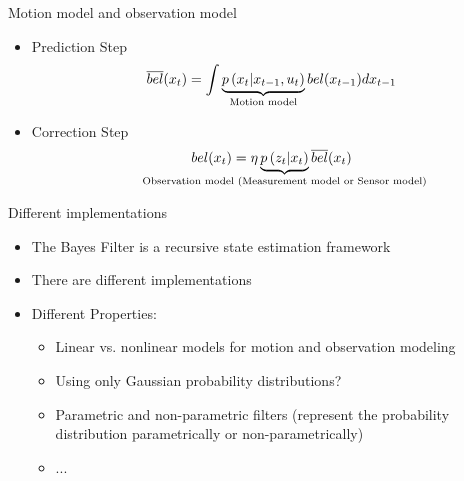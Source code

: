 \begin{frame}{Motion model and observation model}
    \begin{itemize}
     \item Prediction Step
     \begin{equation*}
     \overline{bel}(x_{t}) = \int \underbrace{p\left(x_{t} | x_{t-1}, u_{t} \right)}_{\text{Motion model}} bel(x_{t-1}) d x_{t-1}
    \end{equation*}
    \item Correction Step
    \begin{equation*}
    bel(\state_{t}) = \eta \underbrace{p\left(\observation_{t} |\state_{t} \right)}_{\text{\makebox[0pt]{Observation model (Measurement model or Sensor model)}}} \overline{bel}(\state_{t})
    \end{equation*}
    \end{itemize}
    
    
\end{frame}
    
\begin{frame}{Different implementations}
    \begin{itemize}
    \item The Bayes Filter is a recursive state estimation framework
    \item There are different implementations
    \item Different Properties:
    \begin{itemize}
    \item Linear vs. nonlinear models for motion and observation modeling
    \item Using only Gaussian probability distributions?
    \item Parametric and non-parametric filters (represent the probability distribution parametrically or non-parametrically)
    \item ...
    \end{itemize}
    \end{itemize}
    
\end{frame}
    
